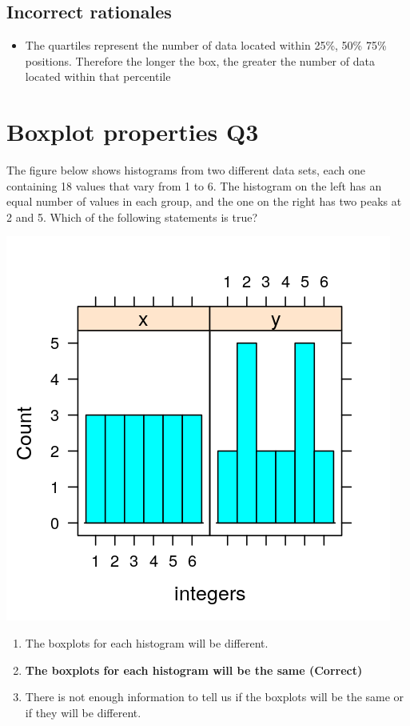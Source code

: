 \documentclass[letterpaper,9pt,twoside,printwatermark=false]{pinp}
\providecommand{\tightlist}{%
  \setlength{\itemsep}{0pt}\setlength{\parskip}{0pt}}
\begin{document}
\hypertarget{incorrect-rationales-1}{%
\subsection{Incorrect rationales}\label{incorrect-rationales-1}}

\begin{itemize}
\tightlist
\item
  The quartiles represent the number of data located within 25\%, 50\%
  75\% positions. Therefore the longer the box, the greater the number
  of data located within that percentile
\end{itemize}

\hypertarget{boxplot-properties-q3}{%
\section{Boxplot properties Q3}\label{boxplot-properties-q3}}

The figure below shows histograms from two different data sets, each one
containing 18 values that vary from 1 to 6. The histogram on the left
has an equal number of values in each group, and the one on the right
has two peaks at 2 and 5. Which of the following statements is true?

\includegraphics{hist.png}

\begin{enumerate}
\def\labelenumi{\alph{enumi})}
\tightlist
\item
  The boxplots for each histogram will be different.
\item
  \textbf{The boxplots for each histogram will be the same (Correct)}
\item
  There is not enough information to tell us if the boxplots will be the
  same or if they will be different.
\end{enumerate}
\end{document}
